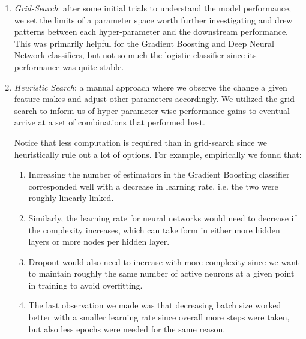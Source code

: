 \documentclass[conference]{IEEEtran}
\begin{document}
        \begin{enumerate}[label=\roman*.]
            \item \textit{Grid-Search}: after some initial trials to understand the model performance, we set the limits of a parameter space worth further investigating and drew patterns between each hyper-parameter and the downstream performance. This was primarily helpful for the Gradient Boosting and Deep Neural Network classifiers, but not so much the logistic classifier since its performance was quite stable.
            
            \item \textit{Heuristic Search}: a manual approach where we observe the change a given feature makes and adjust other parameters accordingly. We utilized the grid-search to inform us of hyper-parameter-wise performance gains to eventual arrive at a set of combinations that performed best.
            
            Notice that less computation is required than in grid-search since we heuristically rule out a lot of options. For example, empirically we found that:
            
            \begin{enumerate}[label=\alph*.]
                \item Increasing the number of estimators in the Gradient Boosting classifier corresponded well with a decrease in learning rate, i.e. the two were roughly linearly linked.
                
                \item Similarly, the learning rate for neural networks would need to decrease if the complexity increases, which can take form in either more hidden layers or more nodes per hidden layer.
                
                \item Dropout would also need to increase with more complexity since we want to maintain roughly the same number of active neurons at a given point in training to avoid overfitting.
                
                \item The last observation we made was that decreasing batch size worked better with a smaller learning rate since overall more steps were taken, but also less epochs were needed for the same reason.
            \end{enumerate}
        \end{enumerate}
\end{document}
